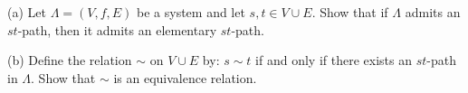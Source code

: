 (a) Let $\Lambda = (V, f, E)$ be a system and let $s, t \in V \cup E$. Show that if $\Lambda$ admits an $st$-path, then it admits an elementary $st$-path.

(b) Define the relation $\sim$ on $V \cup E$ by: $s \sim t$ if and only if there exists an $st$-path in $\Lambda$. Show that $\sim$ is an equivalence relation.
